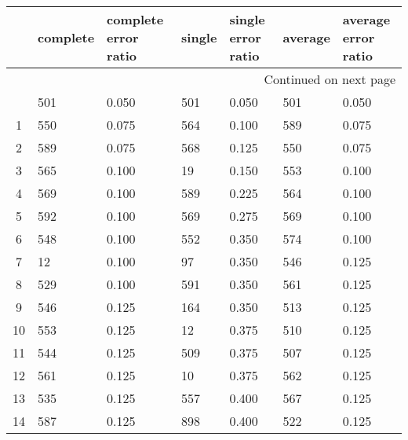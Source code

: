 \begin{longtable}{cp{2cm}p{2cm}p{2cm}p{2cm}p{2cm}p{2cm}}
\toprule
{} &  complete &  complete error ratio &  single &  single error ratio &  average &  average error ratio \\
\midrule
\endhead
\midrule
\multicolumn{7}{r}{{Continued on next page}} \\
\midrule
\endfoot

\bottomrule
\endlastfoot
0  &       501 &                 0.050 &     501 &               0.050 &      501 &                0.050 \\
1  &       550 &                 0.075 &     564 &               0.100 &      589 &                0.075 \\
2  &       589 &                 0.075 &     568 &               0.125 &      550 &                0.075 \\
3  &       565 &                 0.100 &      19 &               0.150 &      553 &                0.100 \\
4  &       569 &                 0.100 &     589 &               0.225 &      564 &                0.100 \\
5  &       592 &                 0.100 &     569 &               0.275 &      569 &                0.100 \\
6  &       548 &                 0.100 &     552 &               0.350 &      574 &                0.100 \\
7  &        12 &                 0.100 &      97 &               0.350 &      546 &                0.125 \\
8  &       529 &                 0.100 &     591 &               0.350 &      561 &                0.125 \\
9  &       546 &                 0.125 &     164 &               0.350 &      513 &                0.125 \\
10 &       553 &                 0.125 &      12 &               0.375 &      510 &                0.125 \\
11 &       544 &                 0.125 &     509 &               0.375 &      507 &                0.125 \\
12 &       561 &                 0.125 &      10 &               0.375 &      562 &                0.125 \\
13 &       535 &                 0.125 &     557 &               0.400 &      567 &                0.125 \\
14 &       587 &                 0.125 &     898 &               0.400 &      522 &                0.125 \\

\end{longtable}
